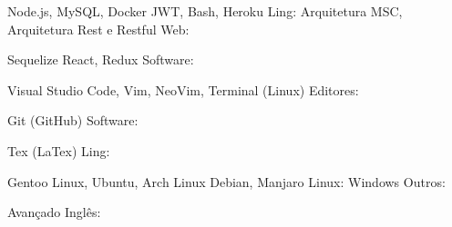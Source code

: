 \begin{cvhonors}
  \cvhonor
    {Node.js, MySQL, Docker}
    {JWT, Bash, Heroku}
    {}
    {Ling:}
  \cvhonor
    {Arquitetura MSC, Arquitetura Rest e Restful}
    {}
    {}
    {Web:}
\end{cvhonors}


\begin{cvhonors}
  \cvhonor
    {Sequelize}
    {React, Redux}
    {}
    {Software:}
\end{cvhonors}
\begin{cvhonors}
  \cvhonor
    {Visual Studio Code, Vim, NeoVim, Terminal (Linux)}
    {}
    {}
    {Editores:}
\end{cvhonors}


\begin{cvhonors}
  \cvhonor
    {Git (GitHub)}
    {}
    {}
    {Software:}
\end{cvhonors}

\begin{cvhonors}
  \cvhonor
    {Tex (LaTex)}
    {}
    {}
    {Ling:}
\end{cvhonors}

\begin{cvhonors}
  \cvhonor
    {Gentoo Linux, Ubuntu, Arch Linux}
    {Debian, Manjaro}
    {}
    {Linux:}
  \cvhonor
    {Windows}
    {}
    {}
    {Outros:}
\end{cvhonors}

\begin{cvhonors}
  \cvhonor
    {Avançado}
    {}
    {}
    {Inglês:}
\end{cvhonors}

\vspace{.5cm}
